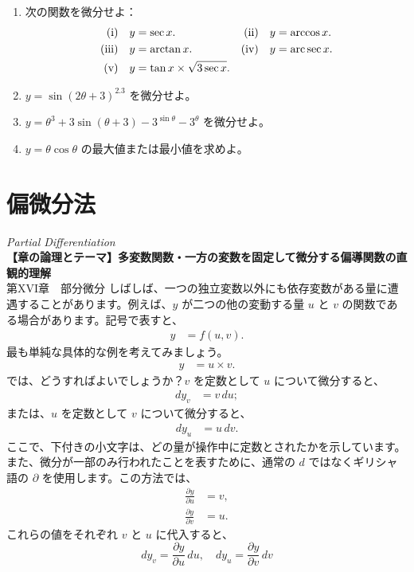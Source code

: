 \documentclass[a4paper,11pt,openany]{ltjsbook}
\begin{document}
\begin{enumerate}
\item[(12)] 次の関数を微分せよ：
\begin{align*}
\text{(i)}\quad   y &= \sec x.    &
\text{(ii)}\quad  y &= \arccos x. \\
\text{(iii)}\quad y &= \arctan x. &
\text{(iv)}\quad  y &= \operatorname{arc\,sec} x. \\
\text{(v)}\quad   y &= \tan x \times  \sqrt{3 \sec x}. &&
\end{align*}

\item[(13)] \(y=\sin(2\theta +3)^{2.3}\) を微分せよ。

\item[(14)] \(y=\theta^3+3 \sin(\theta+3)-3^{\sin \theta} - 3^\theta\) を微分せよ。

\item[(15)] \(y=\theta \cos \theta\) の最大値または最小値を求めよ。

\end{enumerate}



\chapter{偏微分法}
\noindent\textit{\large Partial Differentiation}\\[2mm]
\noindent\textbf{\small 【章の論理とテーマ】多変数関数・一方の変数を固定して微分する偏導関数の直観的理解}\\[4mm]
第XVI章　部分微分
しばしば、一つの独立変数以外にも依存変数がある量に遭遇することがあります。例えば、$y$ が二つの他の変動する量 $u$ と $v$ の関数である場合があります。記号で表すと、
\begin{align*}
y &= f(u, v).
\end{align*}
最も単純な具体的な例を考えてみましょう。
\begin{align*}
y &= u \times v.
\end{align*}
では、どうすればよいでしょうか？$v$ を定数として $u$ について微分すると、
\begin{align*}
dy_v &= v \, du;
\end{align*}
または、$u$ を定数として $v$ について微分すると、
\begin{align*}
dy_u &= u \, dv.
\end{align*}
ここで、下付きの小文字は、どの量が操作中に定数とされたかを示しています。
また、微分が一部のみ行われたことを表すために、通常の $d$ ではなくギリシャ語の $\partial$ を使用します。この方法では、
\begin{align*}
\frac{\partial y}{\partial u} &= v, \\
\frac{\partial y}{\partial v} &= u.
\end{align*}
これらの値をそれぞれ $v$ と $u$ に代入すると、
\[
dy_v = \frac{\partial y}{\partial u} \, du, \quad dy_u = \frac{\partial y}{\partial v} \, dv
\]
\end{document}
